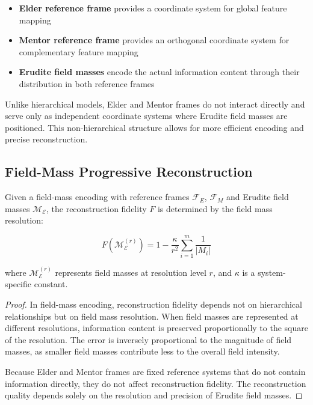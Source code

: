 \begin{itemize}
    \item \textbf{Elder reference frame} provides a coordinate system for global feature mapping
    \item \textbf{Mentor reference frame} provides an orthogonal coordinate system for complementary feature mapping
    \item \textbf{Erudite field masses} encode the actual information content through their distribution in both reference frames
\end{itemize}

Unlike hierarchical models, Elder and Mentor frames do not interact directly and serve only as independent coordinate systems where Erudite field masses are positioned. This non-hierarchical structure allows for more efficient encoding and precise reconstruction.

\subsection{Field-Mass Progressive Reconstruction}

\begin{proposition}
Given a field-mass encoding with reference frames $\mathcal{F}_E$, $\mathcal{F}_M$ and Erudite field masses $\mathcal{M}_\mathcal{E}$, the reconstruction fidelity $F$ is determined by the field mass resolution:

\begin{equation}
F(\mathcal{M}_\mathcal{E}^{(r)}) = 1 - \frac{\kappa}{r^2} \sum_{i=1}^m \frac{1}{|M_i|}
\end{equation}

where $\mathcal{M}_\mathcal{E}^{(r)}$ represents field masses at resolution level $r$, and $\kappa$ is a system-specific constant.
\end{proposition}

\begin{proof}
In field-mass encoding, reconstruction fidelity depends not on hierarchical relationships but on field mass resolution. When field masses are represented at different resolutions, information content is preserved proportionally to the square of the resolution. The error is inversely proportional to the magnitude of field masses, as smaller field masses contribute less to the overall field intensity.

Because Elder and Mentor frames are fixed reference systems that do not contain information directly, they do not affect reconstruction fidelity. The reconstruction quality depends solely on the resolution and precision of Erudite field masses.
\end{proof}

